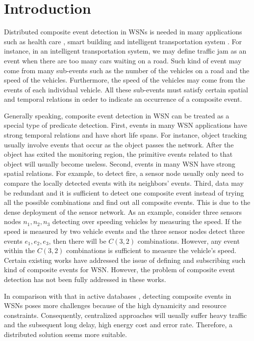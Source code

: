 \section{Introduction}
\label{sec:introduction}
Distributed composite event detection in WSNs is needed in many applications such as health care \cite{lo:ban}, smart building \cite{lynch:shm} and intelligent transportation system \cite{klein:its}. For instance, in an intelligent transportation system, we may define traffic jam as an event when there are too many cars waiting on a road. Such kind of event may come from many sub-events such as the number of the vehicles on a road and the speed of the vehicles. Furthermore, the speed of the vehicles may come from the events of each individual vehicle. All these sub-events must satisfy certain spatial and temporal relations in order to indicate an occurrence of a composite event.

Generally speaking, composite event detection in WSN can be treated as a special type of predicate detection. First, events in many WSN applications have strong temporal relations and have short life spans. For instance, object tracking usually involve events that occur as the object passes the network. After the object has exited the monitoring region, the primitive events related to that object will usually become useless. Second, events in many WSN have strong spatial relations. For example, to detect fire, a sensor node usually only need to compare the locally detected events with its neighbors' events. Third, data may be redundant and it is sufficient to detect one composite event instead of trying all the possible combinations and find out all composite events. This is due to the dense deployment of the sensor network. As an example, consider three sensors nodes \(n_1, n_2, n_3\) detecting over speeding vehicles by measuring the speed. If the speed is measured by two vehicle events and the three sensor nodes detect three events \(e_1, e_2, e_3\), then there will be \(C(3, 2)\) combinations. However, any event within the \(C(3, 2)\) combinations is sufficient to measure the vehicle's speed. Certain existing works \cite{lai:psware} have addressed the issue of defining and subscribing such kind of composite events for WSN. However, the problem of composite event detection has not been fully addressed in these works.

In comparison with that in active databases \cite{samos}, detecting composite events in WSNs poses more challenges because of the high dynamicity and resource constraints. Consequently, centralized approaches will usually suffer heavy traffic and the subsequent long delay, high energy cost and error rate. Therefore, a distributed solution seems more suitable.

